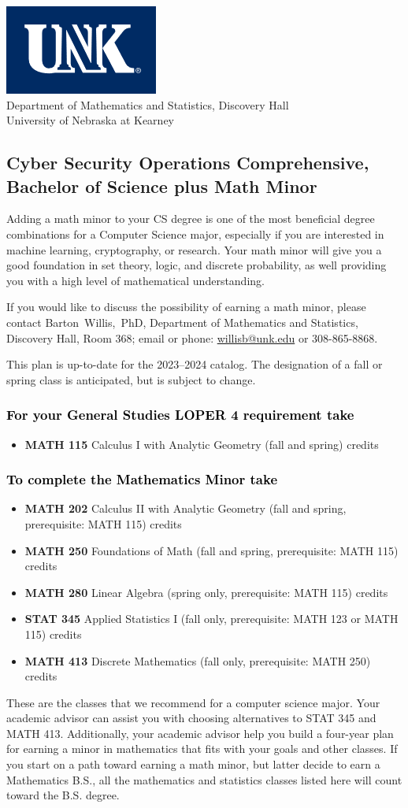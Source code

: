 \documentclass[11pt]{article}
\makeatletter
\newcommand{\calcone}{\textbf{MATH 115} Calculus I with Analytic Geometry (fall and spring) \dotfill 5 credits}
\newcommand{\calctwo}{\textbf{MATH 202} Calculus II with Analytic Geometry (fall and spring, prerequisite: MATH 115) \dotfill 5 credits }
\newcommand{\foundations}{\textbf{MATH 250} Foundations of Math (fall and spring, prerequisite: MATH 115)  \dotfill 3 credits}
\newcommand{\linear}{\textbf{MATH 280} Linear Algebra (spring only, prerequisite: MATH 115) \dotfill 3 credits}
\newcommand{\discrete}{\textbf{MATH 413} Discrete Mathematics  (fall only, prerequisite: MATH 250)\dotfill 3 credits}
\newcommand{\discreteshort}{MATH 413}
\newcommand{\appliedstat}{\textbf{STAT 345} Applied Statistics I (fall only, prerequisite: MATH 123 or MATH 115) \dotfill 3 credits}
\newcommand{\appliedstatshort}{STAT 345}
\newcommand{\contactbw}{\mbox{Barton Willis, PhD}, Department of Mathematics and Statistics,  Discovery Hall, Room 368;
email or phone: \href{mailto:willisb@unk.edu}{willisb@unk.edu} or 308-865-8868.}
\newcommand{\forinfo}[2]{If you would like to discuss the possibility of earning a math {#1}, please contact \contactbw}
\newcommand{\catalog}{2023--2024 }
\newcommand{\LOPER}{LOPER\xspace}
\newcommand{\uptodate}{This plan is up-to-date for  the \catalog catalog. The designation of a fall or spring class is 
anticipated, but  is subject to change.}
\newcommand{\myheading}{
\begin{flushleft}
\includegraphics[scale=0.35]{unk-logo}\\
\setcounter{footnote}{0}
\vspace{0.25in}
 \textcolor{unkblue}{Department of Mathematics and Statistics, Discovery Hall} \\
  \textcolor{unkblue}{University of Nebraska at Kearney}
\end{flushleft}}
\makeatother
\begin{document}
\vfill 
\newpage



\myheading

\subsection*{\textbf{\textcolor{unkblue}{Cyber Security Operations Comprehensive, Bachelor of Science plus Math Minor}}}

Adding a math minor to your CS degree is one of the most beneficial degree combinations 
for a Computer Science major, especially if you are interested in machine learning, 
cryptography,  or research.  Your math minor will give you a good foundation in 
set theory, logic, and discrete probability, as well providing you with a high level of 
mathematical understanding. 

 
 \forinfo{minor}{Cyber Security Operations Comprehensive}

\uptodate
\vspace{-0.1in}

\subsubsection*{\textcolor{black}{For  your General Studies \LOPER 4 requirement take}}
\begin{itemize}
\item  \calcone
\end{itemize}

\subsubsection*{\textcolor{black}{To complete the Mathematics Minor take}}

\begin{itemize}
\item \calctwo
\item \foundations
\item \linear
\item \appliedstat
\item \discrete
\end{itemize}
\vspace{0.1in}
These are the classes that we recommend for a computer science major.
Your academic advisor can assist you with choosing alternatives 
to \appliedstatshort{} and \discreteshort{}. Additionally, your academic advisor help you build a four-year plan for earning 
a minor in mathematics that fits with your goals and other classes.  
If you start on a path toward earning a math minor, but latter decide to earn a  
Mathematics B.S., all the mathematics and statistics  
classes listed here will count toward the B.S. degree.
\end{document}
